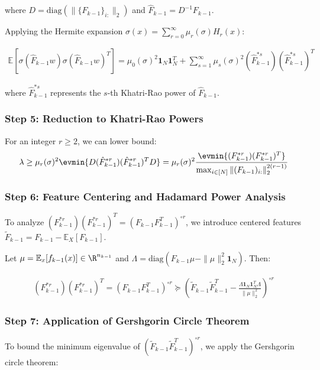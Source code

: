 \documentclass[a4paper]{article}
\newcommand{\E}{\mathbb{E}}
\begin{document}
where $D = \text{diag}(\|\{F_{k-1}\}_{i:}\|_2)$ and $\hat{F}_{k-1} = D^{-1}F_{k-1}$.

Applying the Hermite expansion $\sigma(x) = \sum_{r=0}^{\infty} \mu_r(\sigma) H_r(x)$:

\begin{align}
\E[\sigma(\hat{F}_{k-1}w)\sigma(\hat{F}_{k-1}w)^T] = \mu_0(\sigma)^2 \mathbf{1}_N \mathbf{1}_N^T + \sum_{s=1}^{\infty} \mu_s(\sigma)^2 (\hat{F}_{k-1}^{*s})(\hat{F}_{k-1}^{*s})^T
\end{align}

where $\hat{F}_{k-1}^{*s}$ represents the $s$-th Khatri-Rao power of $\hat{F}_{k-1}$.

\subsubsection{Step 5: Reduction to Khatri-Rao Powers}

For an integer $r \geq 2$, we can lower bound:
\begin{align}
\lambda \geq \mu_r(\sigma)^2 \evmin{D(\hat{F}_{k-1}^{*r})(\hat{F}_{k-1}^{*r})^T D} = \mu_r(\sigma)^2 \frac{\evmin{(F_{k-1}^{*r})(F_{k-1}^{*r})^T}}{\max_{i \in [N]} \|(F_{k-1})_{i:}\|_2^{2(r-1)}}
\end{align}

\subsubsection{Step 6: Feature Centering and Hadamard Power Analysis}

To analyze $(F_{k-1}^{*r})(F_{k-1}^{*r})^T = (F_{k-1}F_{k-1}^T)^{\circ r}$, we introduce centered features $\tilde{F}_{k-1} = F_{k-1} - \E_X[F_{k-1}]$. 

Let $\mu = \E_x[f_{k-1}(x)] \in \R^{n_{k-1}}$ and $\Lambda = \text{diag}(F_{k-1}\mu - \|\mu\|_2^2 \mathbf{1}_N)$. Then:

\begin{align}
(F_{k-1}^{*r})(F_{k-1}^{*r})^T = (F_{k-1}F_{k-1}^T)^{\circ r} \succeq \left(\tilde{F}_{k-1}\tilde{F}_{k-1}^T - \frac{\Lambda \mathbf{1}_N \mathbf{1}_N^T \Lambda}{\|\mu\|_2^2}\right)^{\circ r}
\end{align}

\subsubsection{Step 7: Application of Gershgorin Circle Theorem}

To bound the minimum eigenvalue of $(\tilde{F}_{k-1}\tilde{F}_{k-1}^T)^{\circ r}$, we apply the Gershgorin circle theorem:
\end{document}
